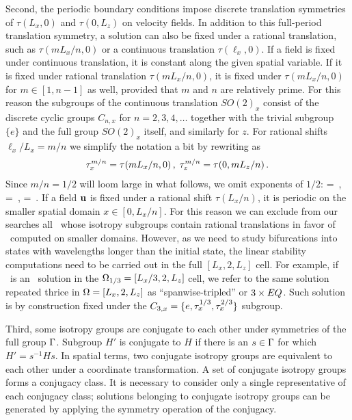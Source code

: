 Second, the periodic boundary conditions impose discrete
translation symmetries of $\tau(L_x, 0)$ and $\tau(0, L_z)$ on
velocity fields. In addition to this full-period translation symmetry,
a solution can also be fixed under a rational translation, such as
$\tau(m L_x/n, 0)$ or a continuous translation $\tau(\ell_x, 0)$.
If a field is fixed under continuous translation, it is
constant along the given spatial variable. If it is fixed under rational
translation $\tau(m L_x/n, 0)$, it is fixed under $\tau(m L_x/n,
0)$ for $m \in [1, n-1]$ as well, provided that $m$ and $n$ are
relatively prime. For this reason the subgroups of the
continuous translation $SO(2)_x$ consist of the discrete cyclic groups
$C_{n,x}$ for $n=2,3,4,\ldots$ together with the trivial subgroup $\{e\}$
and the full group $SO(2)_x$ itself, and similarly for $z$. For rational
shifts $\ell_x/L_x = m/n$ we simplify the notation a bit by rewriting
 as
\begin{align}
\tau_{x}^{m/n} = \tau(m L_x/n, 0) \,,\;
\tau_{z}^{m/n} = \tau(0,m L_z/n) \,.
\label{translDisc}
\end{align}
Since $m/n = 1/2$ will loom large in what follows, we omit exponents of $1/2$:
\beq
     = 
    \,,\;
     = 
    \,,\;
     =  
\,.
\label{tauHalf}
\eeq
If a field ${\bf u}$ is fixed under a rational shift $\tau(L_x/n)$,
it is periodic on the smaller spatial domain $x \in [0,L_x/n]$.
For this reason we can exclude from our searches all \eqv\
whose isotropy subgroups contain
rational translations in favor of \eqva\ computed on smaller domains.
However, as we need to study bifurcations into
states with wavelengths longer than the initial state,
the linear stability computations
need to be carried out in the full $[L_x,2,L_z]$ cell.
For example, if \tEQ{}\ is an \eqv\ solution in the
$\Omega_{1/3}= [L_x/3,2,L_z]$ cell, we refer to the
same solution repeated thrice in $\Omega = [L_x,2,L_z]$
as ``spanwise-tripled'' or
$3 \times {EQ}{}$. Such solution is by construction fixed under the
$C_{3,x} = \{e,\tau_{x}^{1/3},\tau_{x}^{2/3}\}$ subgroup.


Third, some isotropy groups are conjugate to each other under
symmetries of the full group $\Gamma$. Subgroup $H'$ is conjugate to $H$
if there is an $s \in \Gamma$ for which $H' = s^{-1} H s$. In spatial terms,
two conjugate isotropy groups are equivalent to each other under a coordinate
transformation. A set of conjugate isotropy groups forms a conjugacy class.
It is necessary to consider only a single representative of each conjugacy
class; solutions belonging to conjugate isotropy groups can be generated by
applying the symmetry operation of the conjugacy.


